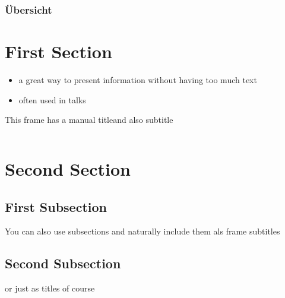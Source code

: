 \documentclass[12pt]{beamer}
\author{} %
\title{} %
\subtitle{} %
\date{} %
\institute{} %
\begin{document}
\begin{frame}[label=titlepage]
\titlepage
\end{frame}

\begin{frame}
	\frametitle{Übersicht}
    \tableofcontents
\end{frame}

\section{First Section}
\begin{frame}{\insertsection}
	\pause %
	\begin{itemize}
	  \item a great way to present information without having too much text\pause
	  \item often used in talks
	\end{itemize}
\end{frame}

\begin{frame}{This frame has a manual title}{and also subtitle}
	\begin{columns}[t]
		\begin{column}{0.5\textwidth} %

		\end{column}
		\begin{column}{0.5\textwidth}
		
		\end{column}
	\end{columns}
\end{frame}


\section{Second Section}
\subsection{First Subsection}
\begin{frame}{\insertsection}{\insertsubsection}
  You can also use subsections and naturally include them als frame subtitles
\end{frame}

\subsection{Second Subsection}
\begin{frame}{\insertsubsection}
  or just as titles of course
\end{frame}
\end{document}
